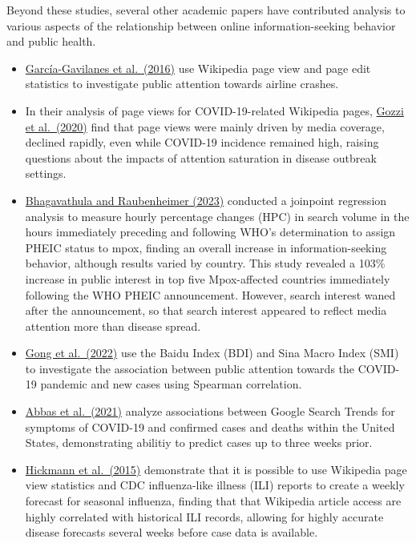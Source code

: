 \documentclass[
  letterpaper,
  DIV=11,
  numbers=noendperiod]{scrartcl}
\begin{document}
Beyond these studies, several other academic papers have contributed
analysis to various aspects of the relationship between online
information-seeking behavior and public health.

\begin{itemize}
\item
  \href{https://doi.org/10.1098/rsos.160460}{García-Gavilanes et
  al.~(2016)} use Wikipedia page view and page edit statistics to
  investigate public attention towards airline crashes.
\item
  In their analysis of page views for COVID-19-related Wikipedia pages,
  \href{https://doi.org/10.2196/21597}{Gozzi et al.~(2020)} find that
  page views were mainly driven by media coverage, declined rapidly,
  even while COVID-19 incidence remained high, raising questions about
  the impacts of attention saturation in disease outbreak settings.
\item
  \href{https://doi.org/10.3390/info14010005}{Bhagavathula and
  Raubenheimer (2023)} conducted a joinpoint regression analysis to
  measure hourly percentage changes (HPC) in search volume in the hours
  immediately preceding and following WHO's determination to assign
  PHEIC status to mpox, finding an overall increase in
  information-seeking behavior, although results varied by country. This
  study revealed a 103\% increase in public interest in top five
  Mpox-affected countries immediately following the WHO PHEIC
  announcement. However, search interest waned after the announcement,
  so that search interest appeared to reflect media attention more than
  disease spread.
\item
  \href{https://doi.org/10.3389/fpubh.2021.755530}{Gong et al.~(2022)}
  use the Baidu Index (BDI) and Sina Macro Index (SMI) to investigate
  the association between public attention towards the COVID-19 pandemic
  and new cases using Spearman correlation.
\item
  \href{https://doi.org/10.3390/ijerph18094560}{Abbas et al.~(2021)}
  analyze associations between Google Search Trends for symptoms of
  COVID-19 and confirmed cases and deaths within the United States,
  demonstrating abilitiy to predict cases up to three weeks prior.
\item
  \href{https://doi.org/10.1371/journal.pcbi.1004239}{Hickmann et
  al.~(2015)} demonstrate that it is possible to use Wikipedia page view
  statistics and CDC influenza-like illness (ILI) reports to create a
  weekly forecast for seasonal influenza, finding that that Wikipedia
  article access are highly correlated with historical ILI records,
  allowing for highly accurate disease forecasts several weeks before
  case data is available.
\end{itemize}
\end{document}
